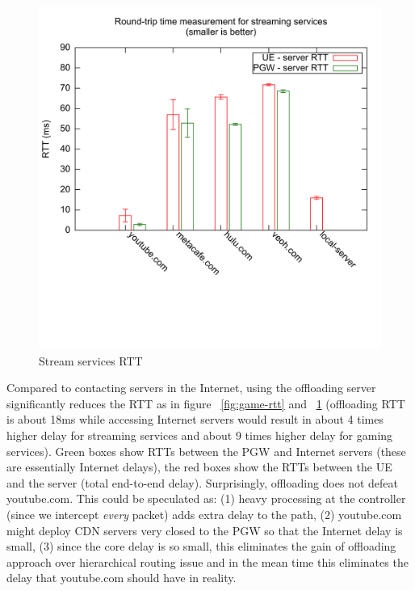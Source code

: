 \begin{figure}[hbtp]
\centering
\includegraphics[scale=0.11]{./figure/streaming-server-rtt.png}
\caption{Stream services RTT}
\label{fig:stream-rtt}
\end{figure}

Compared to contacting servers in the Internet, using the offloading server 
significantly reduces the RTT as in figure ~\ref{fig:game-rtt} and 
~\ref{fig:stream-rtt} (offloading RTT is about 18ms while accessing
Internet servers would result in about 4 times higher delay for streaming services and 
about 9 times higher delay for gaming services). Green boxes show RTTs between the PGW and 
Internet servers (these are essentially Internet delays), the red boxes show the RTTs between 
the UE and the server (total end-to-end delay). Surprisingly, offloading does not defeat 
youtube.com. This could be speculated as: (1) heavy processing 
at the controller (since we intercept \textit{every} packet) adds extra delay to the path, (2) youtube.com 
might deploy CDN servers very closed to the PGW so that the Internet delay is small, (3) since the core delay is 
so small, this eliminates the gain of offloading approach over hierarchical routing issue and in the mean time this 
eliminates the delay that youtube.com should have in reality.



